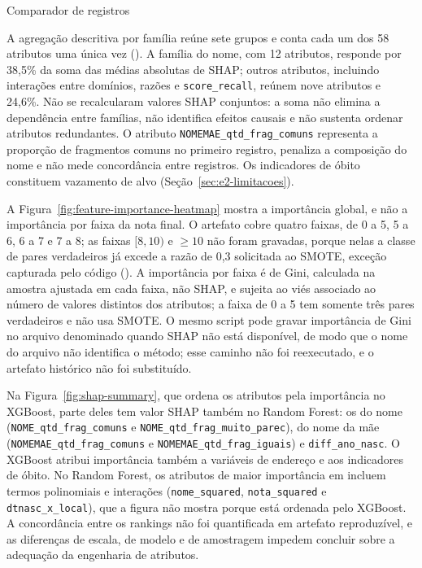 \begin{chapter}{Comparador de registros}
\begin{sloppypar}
A agregação descritiva por família reúne sete grupos e conta cada um dos 58 atributos uma única vez (). A família do nome, com 12 atributos, responde por 38,5\% da soma das médias absolutas de SHAP; outros atributos, incluindo interações entre domínios, razões e \texttt{score\_recall}, reúnem nove atributos e 24,6\%. Não se recalcularam valores SHAP conjuntos: a soma não elimina a dependência entre famílias, não identifica efeitos causais e não sustenta ordenar atributos redundantes. O atributo \texttt{NOMEMAE\_qtd\_frag\_comuns} representa a proporção de fragmentos comuns no primeiro registro, penaliza a composição do nome e não mede concordância entre registros. Os indicadores de óbito constituem vazamento de alvo (Seção~\ref{sec:e2-limitacoes}).

A Figura~\ref{fig:feature-importance-heatmap} mostra a importância global, e não a importância por faixa da nota final. O artefato  cobre quatro faixas, de 0 a 5, 5 a 6, 6 a 7 e 7 a 8; as faixas $[8,10)$ e $\geq10$ não foram gravadas, porque nelas a classe de pares verdadeiros já excede a razão de 0,3 solicitada ao SMOTE, exceção capturada pelo código (). A importância por faixa é de Gini, calculada na amostra ajustada em cada faixa, não SHAP, e sujeita ao viés associado ao número de valores distintos dos atributos; a faixa de 0 a 5 tem somente três pares verdadeiros e não usa SMOTE. O mesmo script pode gravar importância de Gini no arquivo denominado  quando SHAP não está disponível, de modo que o nome do arquivo não identifica o método; esse caminho não foi reexecutado, e o artefato histórico não foi substituído.

Na Figura~\ref{fig:shap-summary}, que ordena os atributos pela importância no XGBoost, parte deles tem valor SHAP também no Random Forest: os do nome (\texttt{NOME\_qtd\_frag\_comuns} e \texttt{NOME\_qtd\_frag\_muito\allowbreak\_parec}), do nome da mãe (\texttt{NOMEMAE\_qtd\_frag\_comuns} e \texttt{NOMEMAE\_qtd\_frag\_iguais}) e \texttt{diff\_ano\_nasc}. O XGBoost atribui importância também a variáveis de endereço e aos indicadores de óbito. No Random Forest, os atributos de maior importância em  incluem termos polinomiais e interações (\texttt{nome\_squared}, \texttt{nota\_squared} e \texttt{dtnasc\_x\_local}), que a figura não mostra porque está ordenada pelo XGBoost. A concordância entre os rankings não foi quantificada em artefato reproduzível, e as diferenças de escala, de modelo e de amostragem impedem concluir sobre a adequação da engenharia de atributos.
\end{sloppypar}


\end{chapter}
